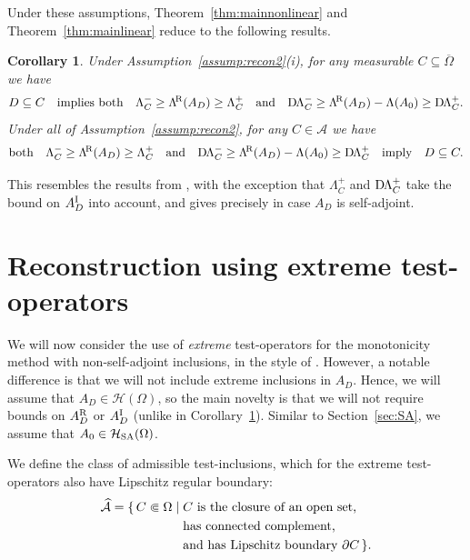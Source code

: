 \documentclass[reqno]{amsart}
\numberwithin{equation}{section}
\numberwithin{figure}{section}
\numberwithin{table}{section}
\theoremstyle{plain}
\newtheorem{corollary}[theorem]{Corollary}
\theoremstyle{definition}
\theoremstyle{remark}
\newcommand{\upR}{^{\textup{R}}}
\newcommand{\upI}{^{\textup{I}}}
\newcommand{\uptR}{^{\!\textup{R}}}
\newcommand{\LambdaR}{\Lambda\uptR}
\newcommand{\AR}{A\upR}
\newcommand{\AI}{A\upI}
\newcommand{\Hsa}{\mathcal{H}_{\textup{SA}}}
\newcommand{\DLambda}{\textup{D}\mkern-1.5mu \Lambda}
\begin{document}
	Under these assumptions, Theorem~\ref{thm:mainnonlinear} and Theorem~\ref{thm:mainlinear} reduce to the following results.
	
	\begin{corollary} \label{coro}
		Under Assumption~\ref{assump:recon2}(i), for any measurable $C\subseteq \overline{\Omega}$ we have
		\begin{equation*}
			D \subseteq C \quad \text{implies both} \quad \Lambda^-_{C} \geq \LambdaR(A_D) \geq \Lambda^+_{C} \quad \text{and} \quad \DLambda^-_{C} \geq \LambdaR(A_D) - \Lambda(A_0) \geq \DLambda^+_{C}.
		\end{equation*}
		Under all of Assumption~\ref{assump:recon2}, for any $C\in\mathcal{A}$ we have
		\begin{equation*}
			\text{both} \quad \Lambda^-_{C} \geq \LambdaR(A_D) \geq \Lambda^+_{C} \quad \text{and} \quad \DLambda^-_{C} \geq \LambdaR(A_D) - \Lambda(A_0) \geq \DLambda^+_{C} \quad \text{imply} \quad D \subseteq C.
		\end{equation*}
	\end{corollary}
	
	This resembles the results from \cite[Theorems 3.6 and 3.7]{GJZ2025}, with the exception that $\Lambda^+_C$ and $\DLambda^+_{C}$ take the bound on $\AI_D$ into account, and gives precisely \cite[Theorems 3.6 and 3.7]{GJZ2025} in case $A_D$ is self-adjoint.
	
	\section{Reconstruction using extreme test-operators} \label{sec:recextreme}
	
	We will now consider the use of \emph{extreme} test-operators for the monotonicity method with non-self-adjoint inclusions, in the style of \cite[theorem~12.2]{GJZ2025}. However, a notable difference is that we will not include extreme inclusions in $A_D$. Hence, we will assume that $A_D\in\mathcal{H}(\Omega)$, so the main novelty is that we will not require bounds on $\AR_D$ or $\AI_D$ (unlike in Corollary~\ref{coro}). Similar to Section~\ref{sec:SA}, we assume that $A_0\in \Hsa(\Omega)$.
	
	We define the class of admissible test-inclusions, which for the extreme test-operators also have Lipschitz regular boundary:
	\begin{align*}
		\widehat{\mathcal{A}} &= \{\, C \Subset \Omega \mid C \text{ is the closure of an open set,}  \\
		&\hphantom{{}= \{C \subset \Omega \mid{}\,}\text{has connected complement,} \\
		&\hphantom{{}= \{C \subset \Omega \mid{}\,}\text{and has Lipschitz boundary } \partial C \,\}.
	\end{align*}
	
\end{document}
